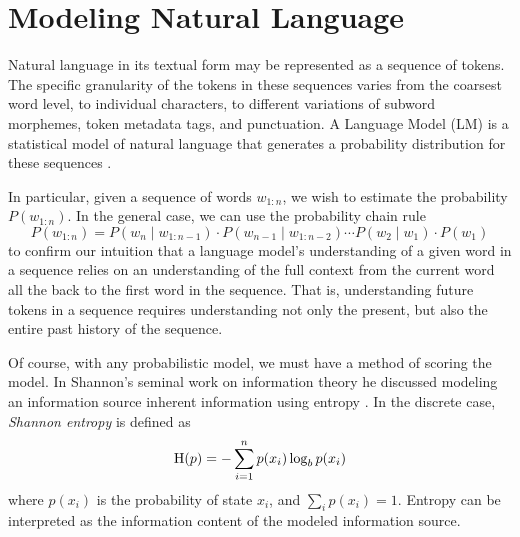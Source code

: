 \section{Modeling Natural Language}\label{sec:introduction:language-models}

Natural language in its textual form may be represented as a sequence of tokens.
The specific granularity of the tokens in these sequences varies from the coarsest word level, to individual characters, to different variations of subword morphemes, token metadata tags, and punctuation.
A Language Model (LM) is a statistical model of natural language that generates a probability distribution for these sequences \cite{goldberg_2017, pappas_meyer_2012}.

In particular, given a sequence of words $w_{1:n}$, we wish to estimate the probability $P(w_{1:n})$.
In the general case, we can use the probability chain rule
\begin{equation}
    P(w_{1:n}) = P(w_n \mid w_{1:n - 1}) \cdot P(w_{n - 1} \mid w_{1:n - 2}) \cdots P(w_2 \mid w_1) \cdot P(w_1)\label{eq:language-models:chain-rule}
\end{equation}
to confirm our intuition that a language model's understanding of a given word in a sequence relies on an understanding of the full context from the current word all the back to the first word in the sequence.
That is, understanding future tokens in a sequence requires understanding not only the present, but also the entire past history of the sequence.

Of course, with any probabilistic model, we must have a method of scoring the model.
In Shannon's seminal work on information theory he discussed modeling an information source inherent information using entropy \cite{Shannon1948}.
In the discrete case, \textit{Shannon entropy} is defined as
\begin{equation}
    \operatorname{H}(p) = - \sum_{i=1}^n p(x_i) \log_b p(x_i) \label{eq:language-models:entropy}
\end{equation}
where $p(x_i)$ is the probability of state $x_i$, and $\sum_i p(x_i) = 1$.
Entropy can be interpreted as the information content of the modeled information source.

